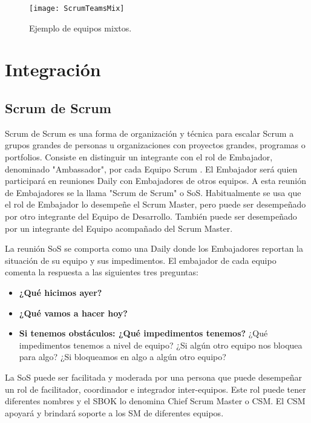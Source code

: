 \begin{figure}[h]
  \centering
  \texttt{[image: ScrumTeamsMix]}
  \caption{Ejemplo de equipos mixtos.}
  \centering
  \label{fig:ScrumTeamsMix} %
\end{figure}

\section{Integración}

\subsection{Scrum de Scrum}

Scrum de Scrum es una forma de organización y técnica para escalar Scrum a grupos grandes de personas u organizaciones con proyectos grandes, programas o portfolios. Consiste en distinguir un integrante con el rol de Embajador, denominado "Ambassador", por cada Equipo Scrum \cite{Stefanini-2013}. El Embajador será quien participará en reuniones Daily con Embajadores de otros equipos. A esta reunión de Embajadores se la llama "Scrum de Scrum" o SoS. Habitualmente se usa que el rol de Embajador lo desempeñe el Scrum Master, pero puede ser desempeñado por otro integrante del Equipo de Desarrollo. También puede ser desempeñado por un integrante del Equipo acompañado del Scrum Master.

La reunión SoS se comporta como una Daily donde los Embajadores reportan la situación de su equipo y sus impedimentos. El embajador de cada equipo comenta la respuesta a las siguientes tres preguntas:

\begin{itemize}
\item \textbf{¿Qué hicimos ayer?}
\item \textbf{¿Qué vamos a hacer hoy?}
\item \textbf{Si tenemos obstáculos: ¿Qué impedimentos tenemos?} ¿Qué impedimentos tenemos a nivel de equipo? ¿Si algún otro equipo nos bloquea para algo? ¿Si bloqueamos en algo a algún otro equipo?
\end{itemize}

La SoS puede ser facilitada y moderada por una persona que puede desempeñar un rol de facilitador, coordinador e integrador inter-equipos. Este rol puede tener diferentes nombres y el SBOK lo denomina Chief Scrum Master o CSM. El CSM apoyará y brindará soporte a los SM de diferentes equipos.

